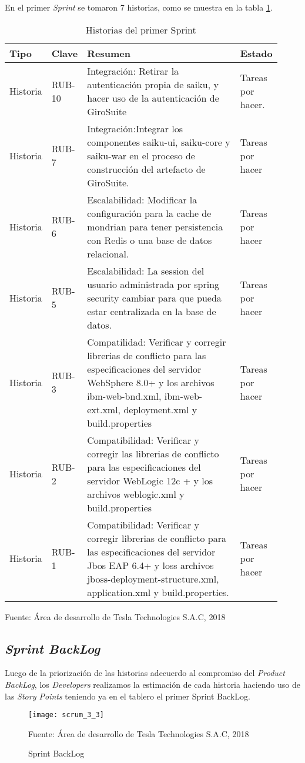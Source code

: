 \begin{spacing}{1.5}
	En el primer \textit{Sprint} se tomaron 7 historias, como se muestra en la tabla \ref{table:III_1}. 
	\begin{table}[H]\centering\small
		\begin{tabular}[H]{m{0.1\linewidth}m{0.1\linewidth}|m{0.6\linewidth} m{0.12\linewidth}}
			\hline
			\rowcolor[HTML]{CBCEFB} 
			\textbf{Tipo} & \textbf{Clave} &\textbf{Resumen} &\textbf{Estado}\\
			\hline
			Historia &RUB-10 &Integración: Retirar la autenticación propia de saiku, y hacer uso de la autenticación de GiroSuite &Tareas por hacer.\\
			\hline
			Historia &RUB-7 &Integración:Integrar los componentes saiku-ui, saiku-core y saiku-war en el proceso de construcción del artefacto de GiroSuite. &Tareas por hacer\\
			\hline
			Historia &RUB-6 &Escalabilidad: Modificar la configuración para la cache de mondrian para tener persistencia con Redis o una base de datos relacional. &Tareas por hacer\\
			\hline
			Historia &RUB-5 &Escalabilidad: La session del usuario administrada por spring security cambiar para que pueda estar centralizada en la base de datos. &Tareas por hacer\\
			\hline
			Historia &RUB-3 &Compatilidad: Verificar y corregir librerias de conflicto para las especificaciones del servidor WebSphere 8.0+ y los archivos ibm-web-bnd.xml, ibm-web-ext.xml, deployment.xml y build.properties &Tareas por hacer\\
			\hline
			Historia &RUB-2 &Compatibilidad: Verificar y corregir las librerias de conflicto para las especificaciones del servidor WebLogic 12c + y los archivos weblogic.xml y build.properties &Tareas por hacer\\
			\hline
			Historia &RUB-1 &Compatibilidad: Verificar y corregir librerias de conflicto para las especificaciones del servidor Jbos EAP 6.4+ y loss archivos jboss-deployment-structure.xml, application.xml y build.properties. &Tareas por hacer\\
			\hline
		\end{tabular}
		\caption{Historias del primer Sprint}
		\small {Fuente: \'{A}rea de desarrollo de Tesla Technologies S.A.C, 2018}
		\label{table:III_1}
	\end{table}
	\subsection{\textit{Sprint BackLog}}
		Luego de la priorizaci\'{o}n de las historias adecuerdo al compromiso del \textit{Product BackLog}, los \textit{Developers} realizamos la estimaci\'{o}n de cada historia haciendo uso de las \textit{Story Points} teniendo ya en el tablero el primer Sprint BackLog. 	
		\begin{figure}[H]
			\centering
			\texttt{[image: scrum\_3\_3]}
			\caption {\centering \small{Sprint BackLog}} \label{figure:chaperIII_3}
			\small {Fuente: \'{A}rea de desarrollo de Tesla Technologies S.A.C, 2018}
		\end{figure}
	

\end{spacing}
